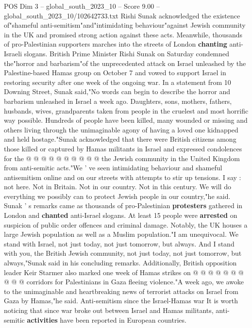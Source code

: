 \begin{textsample}{POS Dim 3 – global\_south\_2023\_10 – Score 9.00 – global\_south\_2023\_10/102642733.txt}  \label{ex:f3_pos_437}
Rishi Sunak acknowledged the existence of"shameful anti-semitism"and"intimidating behaviour"against Jewish community in the UK and promised strong action against these acts.
Meanwhile, thousands of pro-Palestinian supporters marches into the streets of London \textbf{chanting} anti-Israeli slogans.
British Prime Minister Rishi Sunak on Saturday condemned the"horror and barbarism"of the unprecedented attack on Israel unleashed by the Palestine-based Hamas group on October 7 and vowed to support Israel in restoring security after one week of the ongoing war.
In a statement from 10 Downing Street, Sunak said,"No words can begin to describe the horror and barbarism unleashed in Israel a week ago.
Daughters, sons, mothers, fathers, husbands, wives, grandparents taken from people in the cruelest and most horrific way possible.
Hundreds of people have been killed, many wounded or missing and others living through the unimaginable agony of having a loved one kidnapped and held hostage."Sunak acknowledged that there were British citizens among those killed or captured by Hamas militants in Israel and expressed condolences for the @ @ @ @ @ @ @ @ @ @ the Jewish community in the United Kingdom from anti-semitic acts."We ' ve seen intimidating behaviour and shameful antisemitism online and on our streets with attempts to stir up tensions.
I say : not here.
Not in Britain.
Not in our country.
Not in this century.
We will do everything we possibly can to protect Jewish people in our country,"he said.
Sunak ' s remarks came as thousands of pro-Palestinian \textbf{protesters} gathered in London and \textbf{chanted} anti-Israel slogans.
At least 15 people were \textbf{arrested} on suspicion of public order offences and criminal damage.
Notably, the UK houses a large Jewish population as well as a Muslim population."I am unequivocal.
We stand with Israel, not just today, not just tomorrow, but always.
And I stand with you, the British Jewish community, not just today, not just tomorrow, but always,"Sunak said in his concluding remarks.
Additionally, British opposition leader Keir Starmer also marked one week of Hamas strikes on @ @ @ @ @ @ @ @ @ @ corridors for Palestinians in Gaza fleeing violence."A week ago, we awoke to the unimaginable and heartbreaking news of terrorist attacks on Israel from Gaza by Hamas,"he said.
Anti-semitism since the Israel-Hamas war It is worth noticing that since war broke out between Israel and Hamas militants, anti-semitic \textbf{activities} have been reported in European countries.

\end{textsample}
